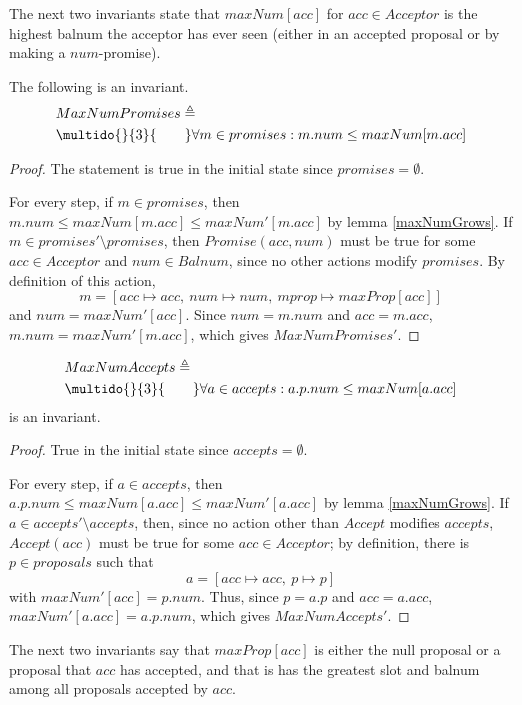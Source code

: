 \documentclass[12pt,a4paper,en]{pracamgr}
\newcommand{\ind}[1]{\multido{}{#1}{\qquad}}
\begin{document}
The next two invariants state that $maxNum[acc]$ for $acc \in Acceptor$ is the highest balnum the acceptor has ever seen (either in an accepted proposal or by making a $num$-promise).

\begin{lemma}
    The following is an invariant.
    \begin{align*}
        & MaxNumPromises \triangleq \\
        & \ind{3} \forall m \in promises: m.num \le maxNum[m.acc]
    \end{align*}
\end{lemma}
\begin{proof}
    The statement is true in the initial state since $promises = \emptyset$.

    For every step, if $m \in promises$, then $m.num \le maxNum[m.acc] \le maxNum'[m.acc]$ by lemma \ref{maxNumGrows}. If $m \in promises' \setminus promises$, then $Promise(acc, num)$ must be true for some $acc \in Acceptor$ and $num \in Balnum$, since no other actions modify $promises$. By definition of this action,
    $$ m = [acc \mapsto acc,\ num \mapsto num,\ mprop \mapsto maxProp[acc]] $$
    and $num = maxNum'[acc]$. Since $num = m.num$ and $acc = m.acc$, $m.num = maxNum'[m.acc]$, which gives $MaxNumPromises'$.
\end{proof}

\begin{lemma}
    \begin{align*}
        & MaxNumAccepts \triangleq \\
        & \ind{3} \forall a \in accepts: a.p.num \le maxNum[a.acc]
    \end{align*}
    is an invariant.
\end{lemma}
\begin{proof}
    True in the initial state since $accepts = \emptyset$.

    For every step, if $a \in accepts$, then $a.p.num \le maxNum[a.acc] \le maxNum'[a.acc]$ by lemma \ref{maxNumGrows}. If $a \in accepts' \setminus accepts$, then, since no action other than $Accept$ modifies $accepts$, $Accept(acc)$ must be true for some $acc \in Acceptor$; by definition, there is $p \in proposals$ such that
    $$ a = [acc \mapsto acc,\ p \mapsto p] $$
    with $maxNum'[acc] = p.num$. Thus, since $p = a.p$ and $acc = a.acc$, $maxNum'[a.acc] = a.p.num$, which gives $MaxNumAccepts'$.
\end{proof}

The next two invariants say that $maxProp[acc]$ is either the null proposal or a proposal that $acc$ has accepted, and that is has the greatest slot and balnum among all proposals accepted by $acc$. 
\end{document}
